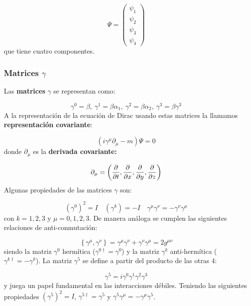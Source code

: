 \begin{equation}
	\Psi = \begin{pmatrix}
		\psi_1 \\ \psi_ 2 \\ \psi_3 \\ \psi_4
	\end{pmatrix}
\end{equation}
que tiene cuatro componentes.

\subsubsection{Matrices $\gamma$}

Las \textbf{matrices} $\gamma$ se representan como:

\begin{equation}
	\gamma^0 = \beta, \ \gamma^1 = \beta \alpha_1, \ \gamma^2 = \beta \alpha_2, \ \gamma^3 = \beta \gamma^3
\end{equation}
A la representación de la ecuación de Dirac usando estas matrices la llamamos \textbf{representación covariante}:

\begin{equation}
	(i\gamma^\mu \partial_\mu - m) \Psi = 0
\end{equation}
donde $\partial_\mu$ es la \textbf{derivada covariante:}

\begin{equation}
	\partial_\mu = \left( \frac{\partial }{\partial t},\frac{\partial }{\partial x},\frac{\partial }{\partial y},\frac{\partial }{\partial z} \right)
\end{equation}
Algunas propiedades de las matrices $\gamma$ son:

\begin{equation}
	(\gamma^0)^2 = I \quad  (\gamma^k) = - I \quad \gamma^\mu \gamma^\nu = - \gamma^\nu \gamma^\mu
\end{equation}
con $k=1,2,3$ y $\mu=0,1,2,3$. De manera análoga se cumplen las siguientes relaciones de anti-conmutación:

\begin{equation}
	\left\lbrace \gamma^\mu , \gamma^\nu \right\rbrace =  \gamma^\mu \gamma^\nu +  \gamma^\nu \gamma^\mu = 2 g^{\mu \nu}
\end{equation}
siendo la matriz $\gamma^0$ hermítica ($\gamma^{0\dagger}=\gamma^0$) y la matriz $\gamma^k$ anti-hermítica ($\gamma^{k\dagger}=-\gamma^k$). La matriz $\gamma^5$ se define a partir del producto de las otras 4:

\begin{equation}
	\gamma^5 = i \gamma^0\gamma^1\gamma^2\gamma^3 
\end{equation}
y juega un papel fundamental en las interacciones débiles. Teniendo las siguientes propiedades $(\gamma^5)^2=I$, $\gamma^{5\dagger}=\gamma^5$ y $\gamma^5 \gamma^\mu = - \gamma^\mu \gamma^5$.

